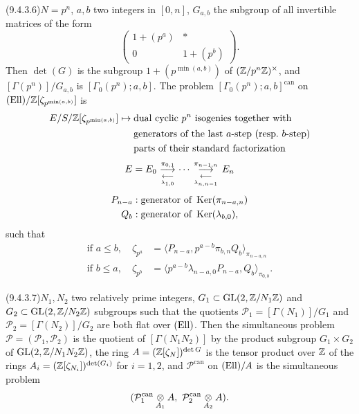 \par{}\noindent{}\label{item:9.4.3.6}(9.4.3.6)\enspace $N = p^n$, $a,b$ two integers in $[0,n]$, $G_{a,b}$ the subgroup of all invertible matrices of the form
\[
\begin{pmatrix} 1 + (p^a) & * \\ 0 & 1 + (p^b) \end{pmatrix} .
\]
Then $\det(G)$ is the subgroup $1 + (p^{\min(a,b)})$ of $(\mathbb{Z}/p^n\mathbb{Z})^\times$, and $[\Gamma(p^n)]/G_{a,b}$ is $[\Gamma_0(p^n); a,b]$. The problem $[\Gamma_0(p^n); a,b]^{\mathrm{can}}$ on $(\mathrm{Ell})/\mathbb{Z}[\zeta_{p^{\min(a,b)}}]$ is
\[
\begin{aligned}
E/S/\mathbb{Z}[\zeta_{p^{\min(a,b)}}] \mapsto {} & \text{dual cyclic $p^n$ isogenies together with} \\
& \text{generators of the last $a$-step (resp.\ $b$-step)} \\
& \text{parts of their standard factorization}
\end{aligned}
\]
\[
E = E_0 \mathrel{ \mathop{\overset{\,\pi_{0,1}\,}{\longrightarrow}} \limits_{\underset{\,\lambda_{1,0}\,}{\longleftarrow}} } \cdots \mathrel{ \mathop{\overset{\,\pi_{n-1,n}\,}{\longrightarrow}} \limits_{\underset{\,\lambda_{n,n-1}\,}{\longleftarrow}} } E_n
\]
\[
\begin{aligned}
P_{n-a} & : \text{generator of } \operatorname{Ker}(\pi_{n-a,n}) \\
Q_b & : \text{generator of } \operatorname{Ker}(\lambda_{b,0}) ,
\end{aligned}
\]
such that
\begin{align*}
\text{if } a \le b, \quad \zeta_{p^a} & = \langle P_{n-a}, p^{a-b}\pi_{b,n} Q_b \rangle_{\pi_{n-a,n}} \\
\text{if } b \le a, \quad \zeta_{p^b} & = \langle p^{a-b}\lambda_{n-a,0} P_{n-a}, Q_b \rangle_{\pi_{0,b}} .
\end{align*}

\par{}\noindent{}\label{item:9.4.3.7}(9.4.3.7)\enspace $N_1, N_2$ two relatively prime integers, $G_1 \subset \operatorname{GL}(2,\mathbb{Z}/N_1\mathbb{Z})$ and $G_2 \subset \operatorname{GL}(2,\mathbb{Z}/N_2\mathbb{Z})$ subgroups such that the quotients $\mathcal{P}_1 = [\Gamma(N_1)]/G_1$ and $\mathcal{P}_2 = [\Gamma(N_2)]/G_2$ are both flat over $(\mathrm{Ell})$. Then the simultaneous problem $\mathcal{P} = (\mathcal{P}_1, \mathcal{P}_2)$ is the quotient of $[\Gamma(N_1 N_2)]$ by the product subgroup $G_1 \times G_2$ of $\operatorname{GL}(2,\mathbb{Z}/N_1 N_2\mathbb{Z})$, the ring $A = (\mathbb{Z}[\zeta_N])^{\det G}$ is the tensor product over $\mathbb{Z}$ of the rings $A_i = (\mathbb{Z}[\zeta_{N_i}])^{\det(G_i)}$ for $i = 1,2$, and $\mathcal{P}^{\mathrm{can}}$ on $(\mathrm{Ell})/A$ is the simultaneous problem
\[
(\mathcal{P}_1^{\mathrm{can}} \underset{A_1}{\otimes} A,\ \mathcal{P}_2^{\mathrm{can}} \underset{A_2}{\otimes} A) .
\]
